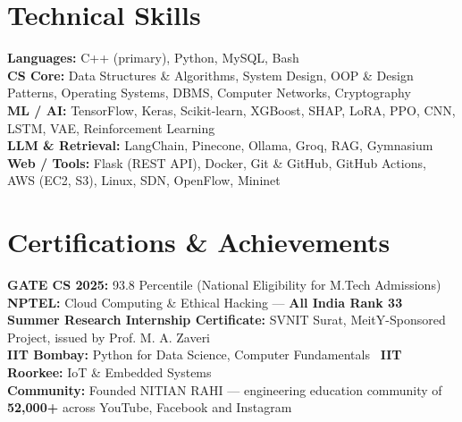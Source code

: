 \documentclass[10pt, legalpaper]{article}
\begin{document}
\section{Technical Skills}

{\small
\noindent\textbf{Languages:} C++ (primary), Python, MySQL, Bash \\
\noindent\textbf{CS Core:} Data Structures \& Algorithms, System Design, OOP \& Design Patterns, Operating Systems, DBMS, Computer Networks, Cryptography \\
\noindent\textbf{ML / AI:} TensorFlow, Keras, Scikit-learn, XGBoost, SHAP, LoRA, PPO, CNN, LSTM, VAE, Reinforcement Learning \\
\noindent\textbf{LLM \& Retrieval:} LangChain, Pinecone, Ollama, Groq, RAG, Gymnasium \\
\noindent\textbf{Web / Tools:} Flask (REST API), Docker, Git \& GitHub, GitHub Actions, AWS (EC2, S3), Linux, SDN, OpenFlow, Mininet
}

\section{Certifications \& Achievements}
{\small
\noindent\textbf{GATE CS 2025:} 93.8 Percentile (National Eligibility for M.Tech Admissions) \\
\noindent\textbf{NPTEL:} Cloud Computing \& Ethical Hacking --- \textbf{All India Rank 33} \\
\noindent\textbf{Summer Research Internship Certificate:} SVNIT Surat, MeitY-Sponsored Project, issued by Prof. M. A. Zaveri \\
\noindent\textbf{IIT Bombay:} Python for Data Science, Computer Fundamentals \textbar\ \textbf{IIT Roorkee:} IoT \& Embedded Systems \\
\noindent\textbf{Community:} Founded NITIAN RAHI --- engineering education community of \textbf{52,000+} across YouTube, Facebook and Instagram
}
\end{document}
